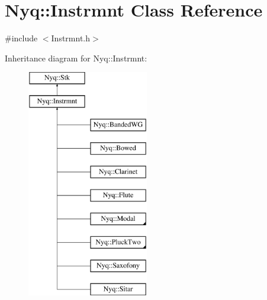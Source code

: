 \hypertarget{class_nyq_1_1_instrmnt}{}\section{Nyq\+:\+:Instrmnt Class Reference}
\label{class_nyq_1_1_instrmnt}


{\ttfamily \#include $<$Instrmnt.\+h$>$}

Inheritance diagram for Nyq\+:\+:Instrmnt\+:\begin{figure}[H]
\begin{center}
\leavevmode
\includegraphics[height=10.000000cm]{class_nyq_1_1_instrmnt}
\end{center}
\end{figure}
